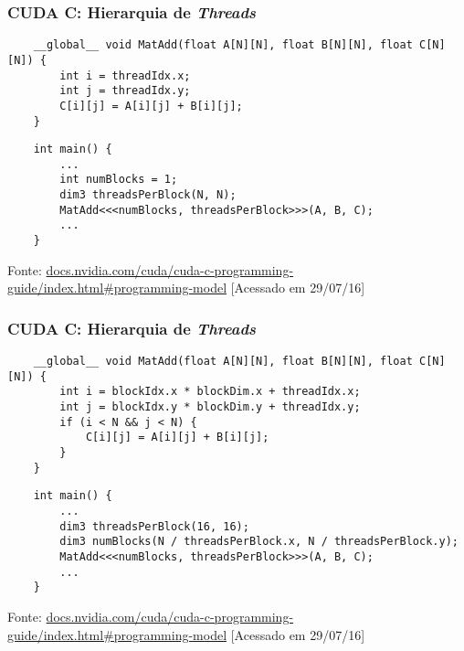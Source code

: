 \documentclass[10pt, compress, aspectratio=43, xcolor={table,usenames,dvipsnames}]{beamer}
\begin{document}
\begin{frame}[fragile]
    \frametitle{CUDA C: Hierarquia de \textit{Threads}}
    \begin{verbatim}
    __global__ void MatAdd(float A[N][N], float B[N][N], float C[N][N]) {
        int i = threadIdx.x;
        int j = threadIdx.y;
        C[i][j] = A[i][j] + B[i][j];
    }
    \end{verbatim}

    \begin{verbatim}
    int main() {
        ...
        int numBlocks = 1;
        dim3 threadsPerBlock(N, N);
        MatAdd<<<numBlocks, threadsPerBlock>>>(A, B, C);
        ...
    }
    \end{verbatim}
    \vfill

    \begin{center}
        \tiny{Fonte: \url{docs.nvidia.com/cuda/cuda-c-programming-guide/index.html\#programming-model} [Acessado em 29/07/16]}
    \end{center}
\end{frame}

\begin{frame}[fragile]
    \frametitle{CUDA C: Hierarquia de \textit{Threads}}
    \begin{verbatim}
    __global__ void MatAdd(float A[N][N], float B[N][N], float C[N][N]) {
        int i = blockIdx.x * blockDim.x + threadIdx.x;
        int j = blockIdx.y * blockDim.y + threadIdx.y;
        if (i < N && j < N) {
            C[i][j] = A[i][j] + B[i][j];
        }
    }
    \end{verbatim}

    \begin{verbatim}
    int main() {
        ...
        dim3 threadsPerBlock(16, 16);
        dim3 numBlocks(N / threadsPerBlock.x, N / threadsPerBlock.y);
        MatAdd<<<numBlocks, threadsPerBlock>>>(A, B, C);
        ...
    }
    \end{verbatim}
    \vfill

    \begin{center}
        \tiny{Fonte: \url{docs.nvidia.com/cuda/cuda-c-programming-guide/index.html\#programming-model} [Acessado em 29/07/16]}
    \end{center}
\end{frame}
\end{document}
